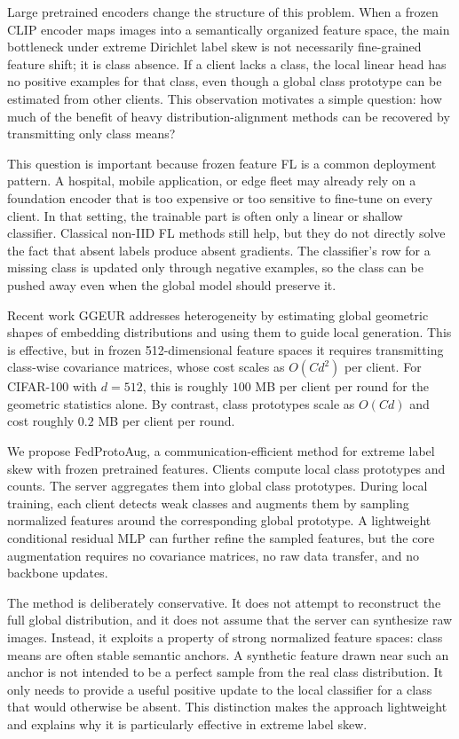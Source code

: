 ﻿\documentclass[conference]{IEEEtran}
\newcommand{\method}{FedProtoAug}
\newcommand{\clip}{CLIP}
\begin{document}
Large pretrained encoders change the structure of this problem. When a frozen \clip{} encoder \cite{radford2021clip} maps images into a semantically organized feature space, the main bottleneck under extreme Dirichlet label skew is not necessarily fine-grained feature shift; it is class absence. If a client lacks a class, the local linear head has no positive examples for that class, even though a global class prototype can be estimated from other clients. This observation motivates a simple question: how much of the benefit of heavy distribution-alignment methods can be recovered by transmitting only class means?

This question is important because frozen feature FL is a common deployment pattern. A hospital, mobile application, or edge fleet may already rely on a foundation encoder that is too expensive or too sensitive to fine-tune on every client. In that setting, the trainable part is often only a linear or shallow classifier. Classical non-IID FL methods still help, but they do not directly solve the fact that absent labels produce absent gradients. The classifier's row for a missing class is updated only through negative examples, so the class can be pushed away even when the global model should preserve it.

Recent work GGEUR \cite{ma2025ggeur} addresses heterogeneity by estimating global geometric shapes of embedding distributions and using them to guide local generation. This is effective, but in frozen 512-dimensional feature spaces it requires transmitting class-wise covariance matrices, whose cost scales as $O(Cd^2)$ per client. For CIFAR-100 with $d=512$, this is roughly $100$ MB per client per round for the geometric statistics alone. By contrast, class prototypes scale as $O(Cd)$ and cost roughly $0.2$ MB per client per round.

We propose \method, a communication-efficient method for extreme label skew with frozen pretrained features. Clients compute local class prototypes and counts. The server aggregates them into global class prototypes. During local training, each client detects weak classes and augments them by sampling normalized features around the corresponding global prototype. A lightweight conditional residual MLP can further refine the sampled features, but the core augmentation requires no covariance matrices, no raw data transfer, and no backbone updates.

The method is deliberately conservative. It does not attempt to reconstruct the full global distribution, and it does not assume that the server can synthesize raw images. Instead, it exploits a property of strong normalized feature spaces: class means are often stable semantic anchors. A synthetic feature drawn near such an anchor is not intended to be a perfect sample from the real class distribution. It only needs to provide a useful positive update to the local classifier for a class that would otherwise be absent. This distinction makes the approach lightweight and explains why it is particularly effective in extreme label skew.
\end{document}
